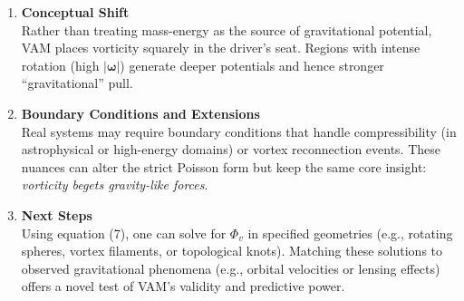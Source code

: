 \begin{enumerate}
    \item \textbf{Conceptual Shift} \\
    Rather than treating mass-energy as the source of gravitational potential, VAM places vorticity squarely in the driver’s seat. Regions with intense rotation (high \(|\boldsymbol{\omega}|\)) generate deeper potentials and hence stronger “gravitational” pull.
    \item \textbf{Boundary Conditions and Extensions} \\
    Real systems may require boundary conditions that handle compressibility (in astrophysical or high-energy domains) or vortex reconnection events. These nuances can alter the strict Poisson form but keep the same core insight: \textit{vorticity begets gravity-like forces}.
    \item \textbf{Next Steps} \\
    Using equation (7), one can solve for \(\Phi_v\) in specified geometries (e.g., rotating spheres, vortex filaments, or topological knots). Matching these solutions to observed gravitational phenomena (e.g., orbital velocities or lensing effects) offers a novel test of VAM’s validity and predictive power.
\end{enumerate}